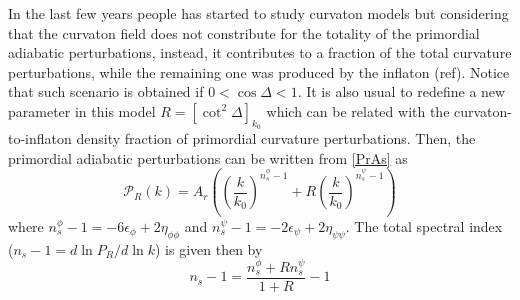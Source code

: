 \documentclass[twocolumn,           %
               showpacs,            %
               preprintnumbers,     %
               aps,                 %
               prl,          	    %
               letterpaper,             %
               superscriptaddress,      %
               nofootinbib,         %
               tightenlines,        %
               floats,floatfix      %
               ,usenatbib,
               ]{revtex4-1}
\begin{document}
In the last few years people has started to study curvaton models but considering that the curvaton field does not constribute for the totality of the primordial adiabatic perturbations, instead, it contributes to a fraction of the total curvature perturbations, while the remaining one was produced by the inflaton (ref). Notice that such scenario is obtained if $0<\cos\Delta <1$. It is also usual to redefine a new parameter in this model $R= [\cot^2\Delta]_{k_0}$ which can be related with the curvaton-to-inflaton density fraction of primordial curvature perturbations. Then, the primordial adiabatic perturbations can be written from \eqref{PrAs} as
\begin{equation}\label{PCr}
\mathcal{P}_R(k)=A_r\left(\left(\frac{k}{k_{0}}\right)^{n_s^\phi-1}+R\left(\frac{k}{k_{0}}\right)^{n_s^\psi-1}\right)
\end{equation}
where $n_s^\phi-1 = -6\epsilon_\phi+2\eta_{\phi\phi}$ and $n_s^\psi-1 = -2\epsilon_\psi+2\eta_{\psi\psi}$.
The total spectral index ($n_s-1=d\ln P_R/d\ln k$) is given then by
\begin{equation}
n_s-1=\frac{n_s^\phi+R n_s^\psi}{1+R}-1
\end{equation}
\end{document}
